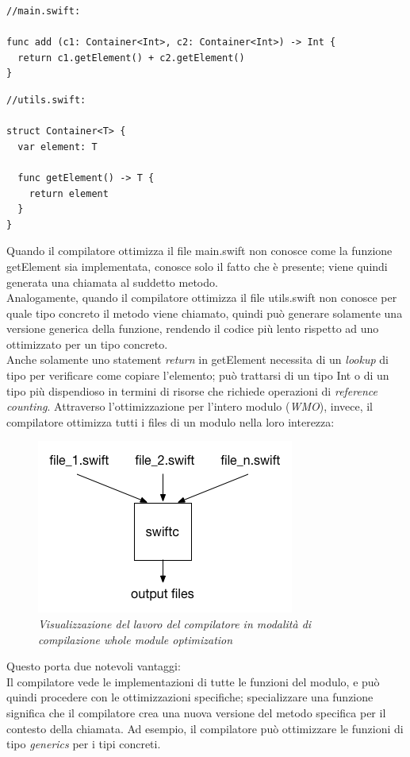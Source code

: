 \begin{lstlisting}
//main.swift:

func add (c1: Container<Int>, c2: Container<Int>) -> Int {
  return c1.getElement() + c2.getElement()
}
\end{lstlisting}
\begin{lstlisting}
//utils.swift:

struct Container<T> {
  var element: T

  func getElement() -> T {
    return element
  }
}
\end{lstlisting}
Quando il compilatore ottimizza il file main.swift non conosce come la funzione getElement sia implementata, conosce solo il fatto che è presente; viene quindi generata una chiamata al suddetto metodo.\\
Analogamente, quando il compilatore ottimizza il file utils.swift non conosce per quale tipo concreto il metodo viene chiamato, quindi può generare solamente una versione generica della funzione, rendendo il codice più lento rispetto ad uno ottimizzato per un tipo concreto.\\
Anche solamente uno statement \textit{return} in getElement necessita di un \textit{lookup} di tipo per verificare come copiare l'elemento; può trattarsi di un tipo Int o di un tipo più dispendioso in termini di risorse che richiede operazioni di \textit{reference counting}.\newpage
Attraverso l'ottimizzazione per l'intero modulo (\textit{WMO}), invece, il compilatore ottimizza tutti i files di un modulo nella loro interezza: 
\begin{figure}[H]
      \centering
      \includegraphics[scale=0.80]{immagini/wmo.png}
            \vspace{0.8cm}
            \caption{\textit{Visualizzazione del lavoro del compilatore in modalità di compilazione whole module optimization}}
\end{figure}
Questo porta due notevoli vantaggi:\\
Il compilatore vede le implementazioni di tutte le funzioni del modulo, e può quindi procedere con le ottimizzazioni specifiche; specializzare una funzione significa che il compilatore crea una nuova versione del metodo specifica per il contesto della chiamata. Ad esempio, il compilatore può ottimizzare le funzioni di tipo \textit{generics} per i tipi concreti.\\
